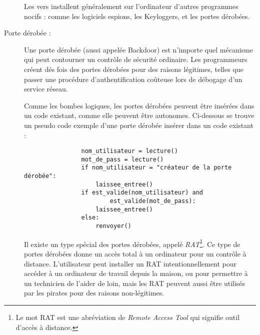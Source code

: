 \begin{description}
            Les vers installent généralement sur l'ordinateur d'autres programmes nocifs : comme les logiciels 
            espions, les Keyloggers, et les portes dérobées. \cite{ver_informatique}

        \item[Porte dérobée :] \label{backdoor} Une porte dérobée (aussi appelée Backdoor) est n'importe quel mécanisme qui peut contourner un
            contrôle de sécurité ordinaire. Les programmeurs créent dés fois des portes dérobées pour 
            des raisons légitimes, telles que passer une procédure d'authentification coûteuse lors 
            de débogage d'un service réseau.

            Comme les bombes logiques, les portes dérobées peuvent être insérées dans un code existant, comme elle
            peuvent être autonomes. Ci-dessous se trouve un pseudo code exemple d'une porte dérobée insérer dans 
            un code existant :
            \begin{verbatim}
                nom_utilisateur = lecture()
                mot_de_pass = lecture()
                if nom_utilisateur = "créateur de la porte dérobée":
                    laissee_entree()
                if est_valide(nom_utilisateur) and 
                        est_valide(mot_de_pass):
                    laissee_entree()
                else:
                    renvoyer()
            \end{verbatim}

            Il existe un type spécial des portes dérobées, appelé \emph{RAT}\footnote{Le mot RAT est une
            abréviation de \emph{Remote Access Tool} qui signifie outil d'accès à distance.}. Ce type de portes
            dérobées donne un accès total à un ordinateur pour un contrôle à distance. L'utilisateur peut
            installer un RAT intentionnellement pour accéder à un ordinateur de travail depuis la maison, ou pour 
            permettre à un technicien de l'aider de loin, mais les RAT peuvent aussi être utilisés par les 
            pirates pour des raisons non-légitimes. \cite{virus} %


\end{description}
